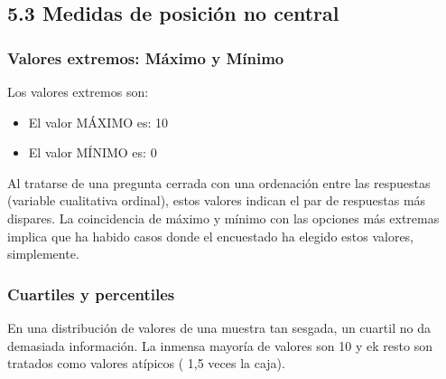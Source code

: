 \documentclass[
]{article}
\newenvironment{Shaded}{\begin{snugshade}}{\end{snugshade}}
\newcommand{\AttributeTok}[1]{\textcolor[rgb]{0.13,0.29,0.53}{#1}}
\newcommand{\ConstantTok}[1]{\textcolor[rgb]{0.56,0.35,0.01}{#1}}
\newcommand{\FunctionTok}[1]{\textcolor[rgb]{0.13,0.29,0.53}{\textbf{#1}}}
\newcommand{\NormalTok}[1]{#1}
\newcommand{\OtherTok}[1]{\textcolor[rgb]{0.56,0.35,0.01}{#1}}
\newcommand{\SpecialCharTok}[1]{\textcolor[rgb]{0.81,0.36,0.00}{\textbf{#1}}}
\providecommand{\tightlist}{%
  \setlength{\itemsep}{0pt}\setlength{\parskip}{0pt}}
\begin{document}
\hypertarget{medidas-de-posiciuxf3n-no-central}{%
\subsection{5.3 Medidas de posición no
central}\label{medidas-de-posiciuxf3n-no-central}}

\hypertarget{valores-extremos-muxe1ximo-y-muxednimo}{%
\subsubsection{Valores extremos: Máximo y
Mínimo}\label{valores-extremos-muxe1ximo-y-muxednimo}}

\begin{Shaded}
\end{Shaded}

Los valores extremos son:

\begin{itemize}
\tightlist
\item
  El valor MÁXIMO es: 10
\item
  El valor MÍNIMO es: 0
\end{itemize}

Al tratarse de una pregunta cerrada con una ordenación entre las
respuestas (variable cualitativa ordinal), estos valores indican el par
de respuestas más dispares. La coincidencia de máximo y mínimo con las
opciones más extremas implica que ha habido casos donde el encuestado ha
elegido estos valores, simplemente.

\hypertarget{cuartiles-y-percentiles}{%
\subsubsection{Cuartiles y percentiles}\label{cuartiles-y-percentiles}}

En una distribución de valores de una muestra tan sesgada, un cuartil no
da demasiada información. La inmensa mayoría de valores son 10 y ek
resto son tratados como valores atípicos ( 1,5 veces la caja).
\end{document}
